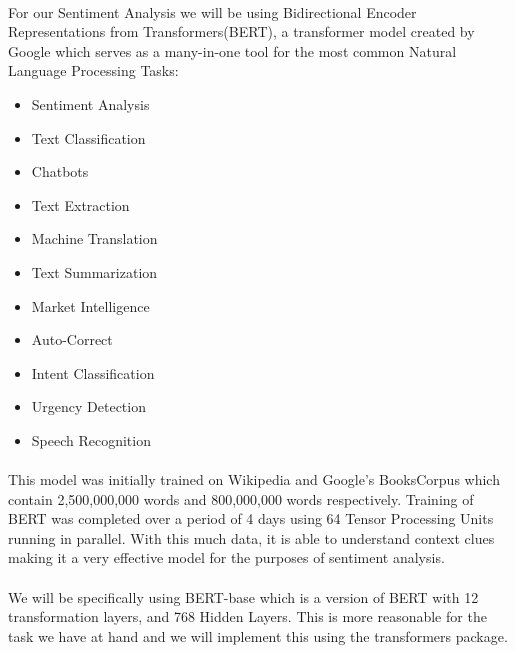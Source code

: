 \documentclass[12pt, letterpaper, titlepage]{article}
\begin{document}
\paragraph{}
For our Sentiment Analysis we will be using Bidirectional Encoder Representations from Transformers(BERT), a transformer model created by Google which serves as a many-in-one tool for the most common Natural Language Processing Tasks:
\begin{itemize}
    \item Sentiment Analysis
    \item Text Classification
    \item Chatbots
    \item Text Extraction
    \item Machine Translation
    \item Text Summarization
    \item Market Intelligence
    \item Auto-Correct
    \item Intent Classification
    \item Urgency Detection
    \item Speech Recognition
\end{itemize}

\paragraph{}
This model was initially trained on Wikipedia and Google’s BooksCorpus which contain 2,500,000,000 words and 800,000,000 words respectively. Training of BERT was completed over a period of 4 days using 64 Tensor Processing Units running in parallel. With this much data, it is able to understand context clues making it a very effective model for the purposes of sentiment analysis.

\paragraph{}
We will be specifically using BERT-base which is a version of BERT with 12 transformation layers, and 768 Hidden Layers.\cite{muller_2022} This is more reasonable for the task we have at hand and we will implement this using the transformers package.
\end{document}
